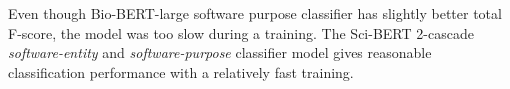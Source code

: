 Even though Bio-BERT-large software purpose classifier has slightly better total F-score, the model was too slow during a training. The Sci-BERT 2-cascade \emph{software-entity} and \emph{software-purpose} classifier model gives reasonable classification performance with a relatively fast training.  






















